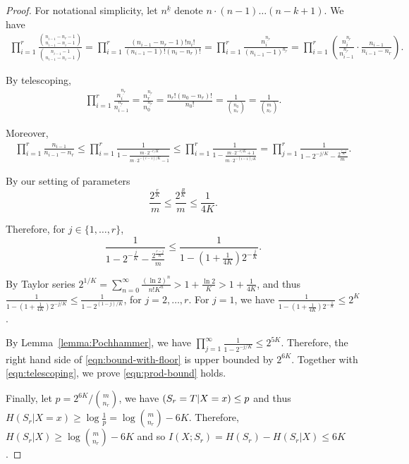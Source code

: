 \documentclass[11pt]{article}
\let\Pr\relax
\DeclareMathOperator*{\Pr}{\mathbb{P}}
\begin{document}
\begin{proof}
  For notational simplicity, let $n^{\underline{k}}$ denote $n\cdot (n-1)\ldots (n-k+1)$. We have 
  \begin{align}
    \prod_{i=1}^{r}{\frac{{n_{i-1}-n_r-1 \choose n_{i-1}-n_i-1}}{{n_{i-1}-1 \choose n_{i-1}-n_i-1}}}
    =\prod_{i=1}^{r}\frac{(n_{i-1}-n_r-1)!n_i!}{(n_{i-1}-1)!(n_i-n_r)!}
    =\prod_{i=1}^{r}\frac{n_i^{\underline{n_r}}}{(n_{i-1}-1)^{\underline{n_r}}}
    =\prod_{i=1}^{r} \left( \frac{n_i^{\underline{n_r}}}{n_{i-1}^{\underline{n_r}}}\cdot \frac{n_{i-1}}{n_{i-1}-n_r} \right).
  \end{align}
  
  By telescoping,
  \begin{align}
    \prod_{i=1}^{r} \frac{n_i^{\underline{n_r}}}{n_{i-1}^{\underline{n_r}}}
    =\frac{n_r^{\underline{n_r}}}{n_0^{\underline{n_r}}}
    =\frac{n_r!(n_0-n_r)!}{n_0!}=\frac{1}{{n_0 \choose n_r}}
    =\frac{1}{{m \choose n_r}}.
    \label{eqn:telescoping}
  \end{align}
  
  Moreover, 
  \begin{align}
    \prod_{i=1}^{r} \frac{n_{i-1}}{n_{i-1}-n_r}
    \le\prod_{i=1}^{r} \frac{1}{1-\frac{m\cdot 2^{-r/K}}{m\cdot 2^{-(i-1)/K}-1}}
    \le\prod_{i=1}^{r} \frac{1}{1-\frac{m\cdot 2^{-r/K}+1}{m\cdot 2^{-(i-1)/K}}}
    =\prod_{j=1}^{r} \frac{1}{1-2^{-j/K}-\frac{2^{\frac{r-j}{K}}}m}.
    \label{eqn:bound-with-floor}
  \end{align}
  
  By our setting of parameters 
  $$\frac{2^{\frac rK}}m \le \frac{2^{\frac RK}}m \le \frac{1}{4K} .$$
  
  Therefore, for $j\in \{1,\ldots, r\}$,
  $$\frac{1}{1-2^{-\frac jK}-\frac{2^{\frac{r-j}{K}}}m}\le \frac{1}{1-(1+\frac{1}{4K})2^{-\frac jK}}.$$ 
  
  By Taylor series $2^{1/K} = \sum_{n=0}^{\infty}{\frac{(\ln 2 )^n}{n!K^n}} >1+\frac{\ln 2}{K}>1+\frac{1}{4K}$, and thus $\frac{1}{1-(1+\frac{1}{4K})2^{-j/K}}\le \frac{1}{1-2^{(1-j)/K}}$, for $j=2,\ldots, r$. For $j=1$, we have $\frac{1}{1-(1+\frac{1}{4K})2^{-\frac 1K}} \le 2^K$.
  
  By Lemma~\ref{lemma:Pochhammer}, we have $\prod_{j=1}^{\infty} \frac{1}{1-2^{-j/K}}\le 2^{5K}$. Therefore, the right hand side of \eqref{eqn:bound-with-floor} is upper bounded by $2^{6K}$. Together with \eqref{eqn:telescoping}, we prove \eqref{eqn:prod-bound} holds.  
  
  Finally, let $p={2^{6K}}/{{m\choose n_r}}$, we have $\Pr(S_r=T|X=x)\le p$ and thus $H(S_r|X=x)\ge \log\frac{1}{p}=\log{{m\choose n_r}}-6K$. Therefore, $H(S_r|X)\ge \log{{m\choose n_r}}-6K$ and so $I(X;S_r)=H(S_r)-H(S_r|X)\le 6K$.  
\end{proof}
\end{document}
